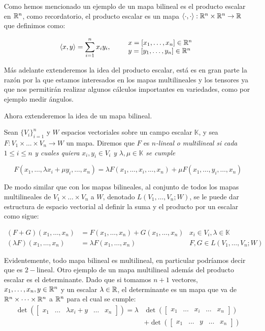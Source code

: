Como hemos mencionado un ejemplo de un mapa bilineal es el producto escalar en $\mathbb{R}^n$, como recordatorio, el producto escalar es un mapa $\langle \cdot , \cdot \rangle: \mathbb{R}^n \times \mathbb{R}^n \to \mathbb{R}$ que definimos como:

\[
  \langle x,y \rangle = \sum_{i=1}^{n} x_iy_i, \quad\quad
  \begin{array}{l}
  x=[x_1,\dots,x_n] \in \mathbb{R}^n\\
  y=[y_1,\dots,y_n] \in \mathbb{R}^n
  \end{array}
\] 

Más adelante extenderemos la idea del producto escalar, está es en gran parte la razón por la que estamos interesados en los mapas multilineales y los tensores ya que nos permitirán realizar algunos cálculos importantes en variedades, como por ejemplo medir ángulos.

Ahora extenderemos la idea de un mapa bilineal.

\begin{definition}
  Sean $\{V_i\}_{i=1}^{n}$ y $W$ espacios vectoriales sobre un campo escalar $\mathbb{K}$, y  sea $F: V_1 \times \dots \times V_n \to W$ un mapa. Diremos que $F$ es \it{$n$-lineal} o \it{multilineal} si cada $1 \leq i \leq n$ y cuales quiera $x_i,y_i \in V_i$ y $\lambda,\mu \in \mathbb{K}$ se cumple 

  \[ F(x_1, \dots, \lambda x_i + \mu y_i, \dots, x_n) = \lambda F(x_1, \dots, x_i, \dots, x_n) + \mu F(x_1, \dots, y_i, \dots, x_n) \]
\end{definition}

De modo similar que con los mapas bilineales, al conjunto de todos los mapas multilineales de $V_1 \times \dots \times V_n$ a $W$, denotado $L(V_1, \dots, V_n; W)$, se le puede dar estructura de espacio vectorial al definir la suma y el producto por un escalar como sigue:

\begin{align*}
  (F+G)(x_1,\dots,x_n) &= F(x_1,\dots,x_n) + G(x_1,\dots,x_n) & x_i \in V_i, \lambda \in \mathbb{K}\\
  (\lambda F)(x_1,\dots,x_n) &= \lambda F(x_1,\dots,x_n) & F,G \in L(V_1,\dots,V_n;W)
\end{align*}

Evidentemente, todo mapa bilineal es multilineal, en particular podríamos decir que es $2-$lineal. Otro ejemplo de un mapa multilineal además del producto escalar es el determinante. Dado que si tomamos $n+1$ vectores, $x_1, \dots, x_n, y \in \mathbb{R}^n$ y un escalar $\lambda \in \mathbb{R}$, el determinante es un mapa que va de $\mathbb{R}^n \times \dots \times \mathbb{R}^n$ a $\mathbb{R}^n$ para el cual se cumple:
\begin{align*}
  \det(\begin{bmatrix}x_1 & \dots & \lambda x_i + y & \dots & x_n \end{bmatrix}) = \lambda &
  \det(\begin{bmatrix}x_1 & \dots &x_i&\dots& x_n \end{bmatrix})\\ 
    &+ \det(\begin{bmatrix}x_1 & \dots & y & \dots & x_n \end{bmatrix})
\end{align*}


